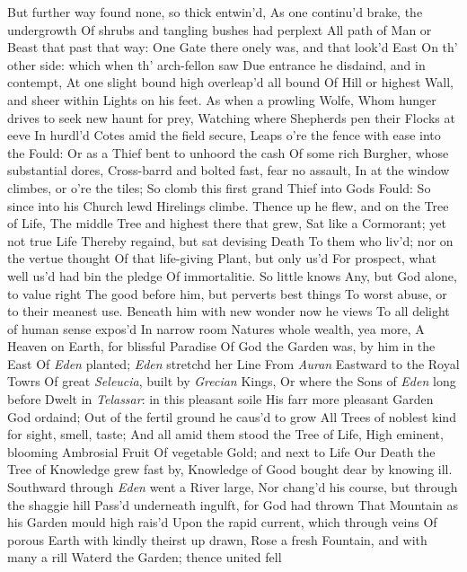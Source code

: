 \documentclass[11pt]{book}
\newcounter {first}
\begin{document}
But further way found none, so thick entwin'd, 
As one continu'd brake, the undergrowth 
Of shrubs and tangling bushes had perplext 
All path of Man or Beast that past that way: 
One Gate there onely was, and that look'd East 
On th' other side: which when th' arch-fellon saw 
Due entrance he disdaind, and in contempt, 
At one slight bound high overleap'd all bound 
Of Hill or highest Wall, and sheer within 
Lights on his feet.  As when a prowling Wolfe, 
Whom hunger drives to seek new haunt for prey, 
Watching where Shepherds pen their Flocks at eeve 
In hurdl'd Cotes amid the field secure, 
Leaps o're the fence with ease into the Fould: 
Or as a Thief bent to unhoord the cash 
Of some rich Burgher, whose substantial dores, 
Cross-barrd and bolted fast, fear no assault, 
In at the window climbes, or o're the tiles; 
So clomb this first grand Thief into Gods Fould: 
So since into his Church lewd Hirelings climbe. 
Thence up he flew, and on the Tree of Life, 
The middle Tree and highest there that grew, 
Sat like a Cormorant; yet not true Life 
Thereby regaind, but sat devising Death 
To them who liv'd; nor on the vertue thought 
Of that life-giving Plant, but only us'd 
For prospect, what well us'd had bin the pledge 
Of immortalitie.  So little knows 
Any, but God alone, to value right 
The good before him, but perverts best things 
To worst abuse, or to their meanest use. 
Beneath him with new wonder now he views 
To all delight of human sense expos'd 
In narrow room Natures whole wealth, yea more, 
A Heaven on Earth, for blissful Paradise 
Of God the Garden was, by him in the East 
Of \textit{Eden} planted; \textit{Eden} stretchd her Line 
From \textit{Auran} Eastward to the Royal Towrs 
Of great \textit{Seleucia}, built by \textit{Grecian} Kings, 
Or where the Sons of \textit{Eden} long before 
Dwelt in \textit{Telassar}: in this pleasant soile 
His farr more pleasant Garden God ordaind; 
Out of the fertil ground he caus'd to grow 
All Trees of noblest kind for sight, smell, taste; 
And all amid them stood the Tree of Life, 
High eminent, blooming Ambrosial Fruit 
Of vegetable Gold; and next to Life 
Our Death the Tree of Knowledge grew fast by, 
Knowledge of Good bought dear by knowing ill. 
Southward through \textit{Eden} went a River large, 
Nor chang'd his course, but through the shaggie hill 
Pass'd underneath ingulft, for God had thrown 
That Mountain as his Garden mould high rais'd 
Upon the rapid current, which through veins 
Of porous Earth with kindly theirst up drawn, 
Rose a fresh Fountain, and with many a rill 
Waterd the Garden; thence united fell 
\end{document}
